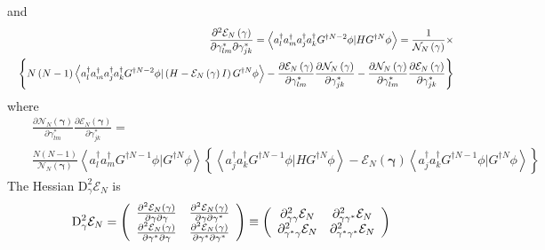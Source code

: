 \documentclass[aps,preprint]{revtex4}
\begin{document}
and 
\begin{eqnarray}
&&\frac{\partial ^{2}\mathcal{E}_{N}\left( \mathbf{\gamma }\right) }{%
\partial \gamma _{lm}^{\ast }\partial \gamma _{jk}^{\ast }}=\left\langle
a_{l}^{\dagger }a_{m}^{\dagger }a_{j}^{\dagger }a_{k}^{\dagger }G^{\dagger
N-2}\phi |HG^{\dagger N}\phi \right\rangle =\frac{1}{\mathcal{N}_{N}\left( 
\mathbf{\gamma }\right) }\times  \nonumber \\
&&\left\{ N\left( N-1\right) \left\langle a_{l}^{\dagger }a_{m}^{\dagger
}a_{j}^{\dagger }a_{k}^{\dagger }G^{\dagger N-2}\phi |\left( H-\mathcal{E}%
_{N}\left( \mathbf{\gamma }\right) I\right) G^{\dagger N}\phi \right\rangle -%
\frac{\partial \mathcal{E}_{N}\left( \mathbf{\gamma }\right) }{\partial
\gamma _{lm}^{\ast }}\frac{\partial \mathcal{N}_{N}\left( \mathbf{\gamma }%
\right) }{\partial \gamma _{jk}^{\ast }}-\frac{\partial \mathcal{N}%
_{N}\left( \mathbf{\gamma }\right) }{\partial \gamma _{lm}^{\ast }}\frac{%
\partial \mathcal{E}_{N}\left( \mathbf{\gamma }\right) }{\partial \gamma
_{jk}^{\ast }}\right\}
\end{eqnarray}%
where 
\begin{eqnarray}
&&\frac{\partial \mathcal{N}_{N}\left( \mathbf{\gamma }\right) }{\partial
\gamma _{lm}^{\ast }}\frac{\partial \mathcal{E}_{N}\left( \mathbf{\gamma }%
\right) }{\partial \gamma _{jk}^{\ast }}=  \nonumber \\
&&\frac{N\left( N-1\right) }{\mathcal{N}_{N}\left( \mathbf{\gamma }\right) }%
\left\langle a_{l}^{\dagger }a_{m}^{\dagger }G^{\dagger N-1}\phi |G^{\dagger
N}\phi \right\rangle \left\{ \left\langle a_{j}^{\dagger }a_{k}^{\dagger
}G^{\dagger N-1}\phi |HG^{\dagger N}\phi \right\rangle -\mathcal{E}%
_{N}\left( \mathbf{\gamma }\right) \left\langle a_{j}^{\dagger
}a_{k}^{\dagger }G^{\dagger N-1}\phi |G^{\dagger N}\phi \right\rangle
\right\}
\end{eqnarray}%
The Hessian $\mathrm{D}_{\gamma }^{2}\mathcal{E}_{N}$ is 
\begin{equation}
\mathrm{D}_{\gamma }^{2}\mathcal{E}_{N}=\left( 
\begin{array}{cc}
\frac{\partial ^{2}\mathcal{E}_{N}\left( \mathbf{\gamma }\right) }{\partial 
\mathbf{\gamma }\partial \mathbf{\gamma }} & \frac{\partial ^{2}\mathcal{E}%
_{N}\left( \mathbf{\gamma }\right) }{\partial \mathbf{\gamma }\partial 
\mathbf{\gamma }^{\ast }} \\ 
\frac{\partial ^{2}\mathcal{E}_{N}\left( \mathbf{\gamma }\right) }{\partial 
\mathbf{\gamma }^{\ast }\partial \mathbf{\gamma }} & \frac{\partial ^{2}%
\mathcal{E}_{N}\left( \mathbf{\gamma }\right) }{\partial \mathbf{\gamma }%
^{\ast }\partial \mathbf{\gamma }^{\ast }}%
\end{array}%
\right) \equiv \left( 
\begin{array}{cc}
\mathrm{\partial }_{\gamma \gamma }^{2}\mathcal{E}_{N} & \mathrm{\partial }%
_{\gamma \gamma ^{\ast }}^{2}\mathcal{E}_{N} \\ 
\mathrm{\partial }_{\gamma ^{\ast }\gamma }^{2}\mathcal{E}_{N} & \mathrm{%
\partial }_{\gamma ^{\ast }\gamma ^{\ast }}^{2}\mathcal{E}_{N}%
\end{array}%
\right)
\end{equation}%
\end{document}
